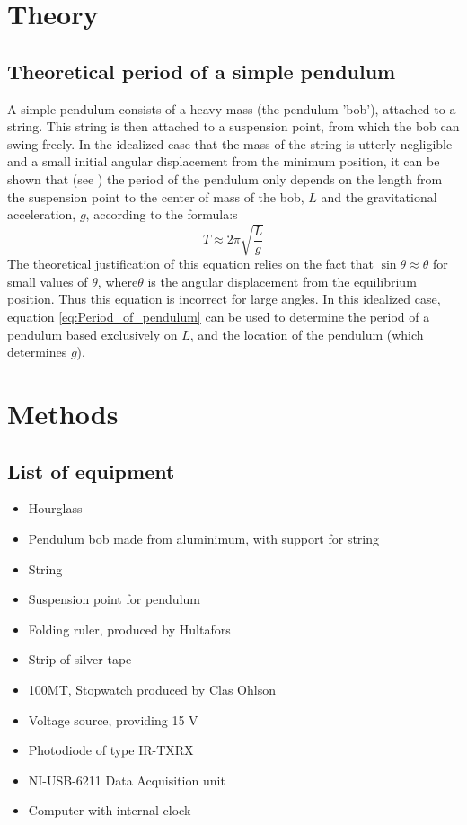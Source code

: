 \documentclass[a4paper, 10pt]{article}
\begin{document}
\section{Theory}
\subsection{Theoretical period of a simple pendulum}
A simple pendulum consists of a heavy mass (the pendulum 'bob'), attached to a string. This string is then attached to a suspension point, from which the bob can swing freely. In the idealized case that the mass of the string is utterly negligible and a small initial angular displacement from the minimum position, it can be shown that (see \cite{pendulum}) the period of the pendulum only depends on the length from the suspension point to the center of mass of the bob, $L$ and the gravitational acceleration, $g$, according to the formula:s
\begin{equation}\label{eq:Period_of_pendulum}
T\approx2\pi \sqrt{\frac{L}{g}}
\end{equation}
The theoretical justification of this equation relies on the fact that $\sin \theta \approx \theta$ for small values of $\theta$, where$\theta$ is the angular displacement from the equilibrium position. Thus this equation is incorrect for large angles. In this idealized case, equation \ref{eq:Period_of_pendulum} can be used to determine the period of a pendulum based exclusively on $L$, and the location of the pendulum (which determines $g$). 
\section{Methods}
\subsection{List of equipment}
\begin{itemize}
\item Hourglass
\item Pendulum bob made from aluminimum, with support for string
\item String
\item Suspension point for pendulum
\item Folding ruler, produced by Hultafors
\item Strip of silver tape 
\item 100MT, Stopwatch produced by Clas Ohlson
\item Voltage source, providing 15 V
\item Photodiode of type IR-TXRX
\item NI-USB-6211 Data Acquisition unit
\item Computer with internal clock
\end{itemize}
\end{document}
